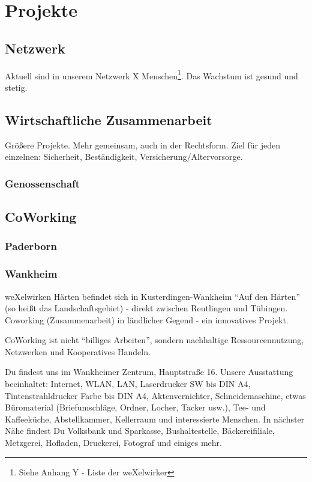\chapter{Projekte}
  \section{Netzwerk}
Aktuell sind in unserem Netzwerk X Menschen\footnote{Siehe Anhang Y - Liste der weXelwirker}. Das Wachstum ist gesund und stetig.
  \section{Wirtschaftliche Zusammenarbeit}
Größere Projekte. Mehr gemeinsam, auch in der Rechtsform.
Ziel für jeden einzelnen: Sicherheit, Beständigkeit, Versicherung/Altervorsorge.
    \subsection{Genossenschaft}
  \section{CoWorking}
    \subsection{Paderborn}
    \subsection{Wankheim}
weXelwirken Härten befindet sich in Kusterdingen-Wankheim "`Auf den Härten"' (so heißt das Landschaftsgebiet) - direkt zwischen Reutlingen und Tübingen.
%
Coworking (Zusammenarbeit) in ländlicher Gegend - ein innovatives Projekt.



CoWorking ist nicht "`billiges Arbeiten"', sondern nachhaltige Ressourcennutzung, Netzwerken und Kooperatives Handeln.




Du findest uns im Wankheimer Zentrum, Hauptstraße 16.
Unsere Ausstattung beeinhaltet: Internet, WLAN, LAN, Laserdrucker SW bis DIN A4, Tintenstrahldrucker Farbe bis DIN A4, Aktenvernichter, Schneidemaschine, etwas Büromaterial (Briefumschläge, Ordner, Locher, Tacker usw.), Tee- und Kaffeeküche, Abstellkammer, Kellerraum und interessierte Menschen.
%
In nächster Nähe findest Du Volksbank und Sparkasse, Bushaltestelle, Bäckereifiliale, Metzgerei, Hofladen, Druckerei, Fotograf und einiges mehr.



